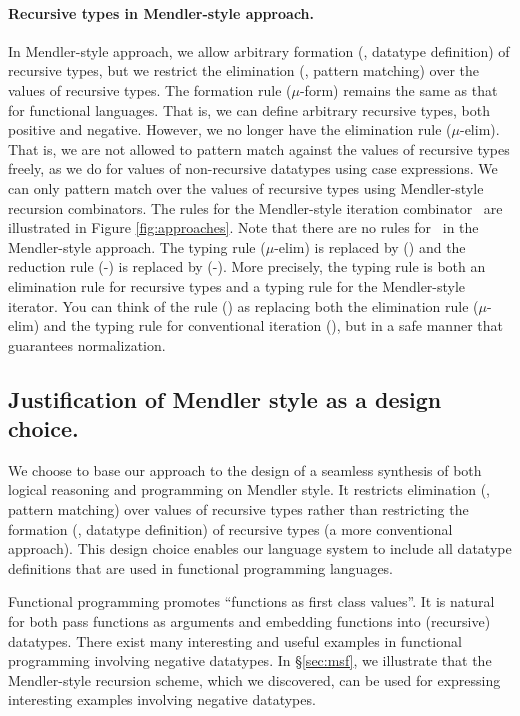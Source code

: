 \paragraph{Recursive types in Mendler-style approach.}
In Mendler-style approach, we allow arbitrary formation
(\ie, datatype definition) of recursive types, but we restrict
the elimination (\ie, pattern matching) over the values of recursive types. 
The formation rule {\small($\mu$-form)} remains the same as that for
functional languages. That is, we can define arbitrary recursive types,
both positive and negative. However, we no longer have the elimination rule
{\small($\mu$-elim)}. That is, we are not allowed to pattern match against
the values of recursive types freely, as we do for values of
non-recursive datatypes using case expressions. We can only pattern match over
the values of recursive types using Mendler-style recursion combinators.
The rules for the Mendler-style iteration combinator \MIt\ are illustrated
in Figure \ref{fig:approaches}.
Note that there are no rules for \unIn\ in the Mendler-style approach.
The typing rule {\small($\mu$-elim)} is replaced by {\small(\MIt)} and
the reduction rule {\small(\unIn-\In)} is replaced by {\small(\MIt-\In)}.
More precisely, the typing rule {\small \MIt} is both an elimination rule
for recursive types and a typing rule for the Mendler-style iterator.
You can think of the rule {\small(\MIt)} as replacing both the elimination rule
{\small($\mu$-elim)} and the typing rule for conventional iteration
{\small(\It)}, but in a safe manner that guarantees normalization.

\subsection{Justification of Mendler style as a design choice.}
\label{sec:intro:concepts:mendler}
We choose to base our approach to the design of a seamless synthesis of both
logical reasoning and programming on Mendler style. It restricts
elimination (\ie, pattern matching) over values of recursive types
rather than restricting the formation (\ie, datatype definition) of
recursive types (a more conventional approach). 
This design choice enables our language system to include
all datatype definitions that are used in functional programming languages.

Functional programming promotes ``functions as first class values''.
It is natural for both pass functions as arguments and embedding functions
into (recursive) datatypes. There exist many interesting and useful examples
in functional programming involving negative datatypes. In \S\ref{sec:msf},
we illustrate that the Mendler-style recursion scheme, which we discovered,
can be used for expressing interesting examples involving negative datatypes.

